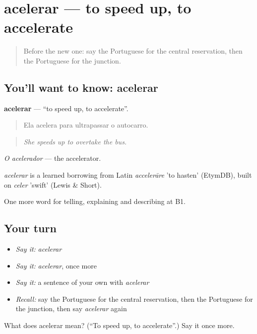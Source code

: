 \section[acelerar]{acelerar — to speed up, to accelerate}

\label{lesson:PT-C401-acelerar}



\begin{quote}
Before the new one: say the Portuguese for the central reservation, then the Portuguese for the junction.
\end{quote}

\subsection*{You'll want to know: acelerar}
\textbf{acelerar} — \textquotedblleft{}to speed up, to accelerate\textquotedblright{}.

\begin{quote}
Ela acelera para ultrapassar o autocarro.
\end{quote}

\begin{quote}
\emph{She speeds up to overtake the bus.}
\end{quote}

\emph{O acelerador} — the accelerator.

\begin{cousinweb}
\emph{acelerar} is a learned borrowing from Latin \emph{accelerāre} 'to hasten' (EtymDB), built on \emph{celer} 'swift' (Lewis \& Short).
\end{cousinweb}

\begin{grammarlens}[title={What you've built}]
One more word for telling, explaining and describing at B1.
\end{grammarlens}

\subsection*{Your turn}
\begin{itemize}
\raggedright
  \item \emph{Say it:} \emph{acelerar}
  \item \emph{Say it:} \emph{acelerar}, once more
  \item \emph{Say it:} a sentence of your own with \emph{acelerar}
  \item \emph{Recall:} say the Portuguese for the central reservation, then the Portuguese for the junction, then say \emph{acelerar} again
\end{itemize}

\begin{tcolorbox}[breakable,colback=teal!4,colframe=teal!35!black,title={Before you move on}]
What does acelerar mean? (\textquotedblleft{}To speed up, to accelerate\textquotedblright{}.) Say it once more.
\end{tcolorbox}
